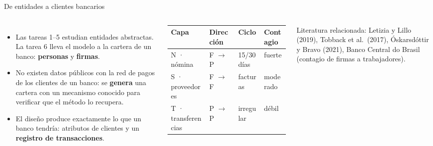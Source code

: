 \documentclass[aspectratio=169,10pt]{beamer}
\begin{document}
\begin{frame}{De entidades a clientes bancarios}
\begin{columns}[T]
\begin{itemize}
\item Las tareas 1–5 estudian entidades abstractas. La tarea 6 lleva el modelo a la
cartera de un banco: \textbf{personas} y \textbf{firmas}.
\item No existen datos públicos con la red de pagos de los clientes de un banco: se
\textbf{genera} una cartera con un mecanismo conocido para verificar que el método lo
recupera.
\item El diseño produce exactamente lo que un banco tendría: atributos de clientes y un
\textbf{registro de transacciones}.
\end{itemize}
\scriptsize
\begin{tabular}{llll}
\toprule
Capa & Dirección & Ciclo & Contagio \\
\midrule
N · nómina & F $\to$ P & 15/30 días & fuerte \\
S · proveedores & F $\to$ F & facturas & moderado \\
T · transferencias & P $\to$ P & irregular & débil \\
\bottomrule
\end{tabular}
\vspace{0.2cm}

\small Literatura relacionada: Letizia y Lillo (2019), Tobback et al.\ (2017),
Óskarsdóttir y Bravo (2021), Banco Central do Brasil (contagio de firmas a
trabajadores).
\end{columns}
\end{frame}
\end{document}
